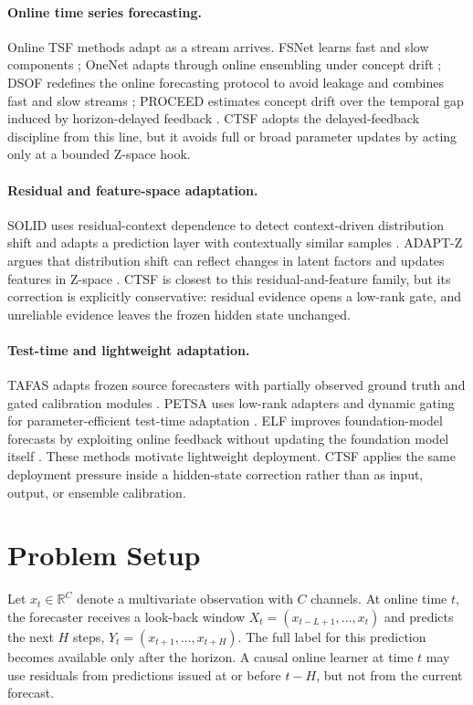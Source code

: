 \documentclass[10pt]{article}
\begin{document}
\paragraph{Online time series forecasting.}
Online TSF methods adapt as a stream arrives. FSNet learns fast and slow components \cite{pham2023fsnet}; OneNet adapts through online ensembling under concept drift \cite{wen2023onenet}; DSOF redefines the online forecasting protocol to avoid leakage and combines fast and slow streams \cite{lau2025dsof}; PROCEED estimates concept drift over the temporal gap induced by horizon-delayed feedback \cite{zhao2025proceed}. CTSF adopts the delayed-feedback discipline from this line, but it avoids full or broad parameter updates by acting only at a bounded Z-space hook.

\paragraph{Residual and feature-space adaptation.}
SOLID uses residual-context dependence to detect context-driven distribution shift and adapts a prediction layer with contextually similar samples \cite{chen2024solid}. ADAPT-Z argues that distribution shift can reflect changes in latent factors and updates features in Z-space \cite{huang2026adaptz}. CTSF is closest to this residual-and-feature family, but its correction is explicitly conservative: residual evidence opens a low-rank gate, and unreliable evidence leaves the frozen hidden state unchanged.

\paragraph{Test-time and lightweight adaptation.}
TAFAS adapts frozen source forecasters with partially observed ground truth and gated calibration modules \cite{kim2025tafas}. PETSA uses low-rank adapters and dynamic gating for parameter-efficient test-time adaptation \cite{medeiros2025petsa}. ELF improves foundation-model forecasts by exploiting online feedback without updating the foundation model itself \cite{lee2025elf}. These methods motivate lightweight deployment. CTSF applies the same deployment pressure inside a hidden-state correction rather than as input, output, or ensemble calibration.

\section{Problem Setup}
Let $x_t \in \mathbb{R}^{C}$ denote a multivariate observation with $C$ channels. At online time $t$, the forecaster receives a look-back window $X_t = (x_{t-L+1}, \ldots, x_t)$ and predicts the next $H$ steps, $Y_t = (x_{t+1}, \ldots, x_{t+H})$. The full label for this prediction becomes available only after the horizon. A causal online learner at time $t$ may use residuals from predictions issued at or before $t-H$, but not from the current forecast.
\end{document}
